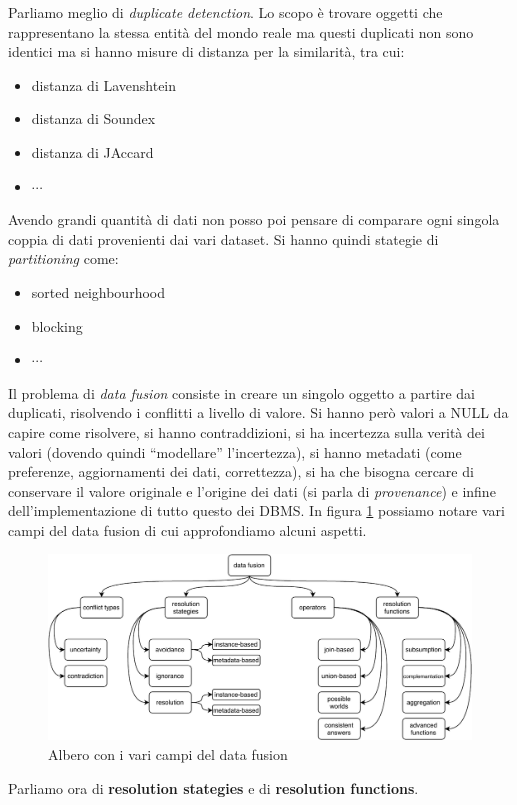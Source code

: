\documentclass[a4paper,12pt, oneside]{book}
\begin{document}
Parliamo meglio di \textit{duplicate detenction}. Lo scopo è trovare oggetti che
rappresentano la stessa entità del mondo reale ma questi duplicati non sono
identici ma si hanno misure di distanza per la similarità, tra cui:
\begin{itemize}
  \item distanza di Lavenshtein
  \item distanza di Soundex
  \item distanza di JAccard
  \item $\cdots$
\end{itemize}
Avendo grandi quantità di dati non posso poi pensare di comparare ogni singola
coppia di dati provenienti dai vari dataset. Si hanno quindi stategie di
\textit{partitioning} come:
\begin{itemize}
  \item sorted neighbourhood
  \item blocking
  \item $\cdots$
\end{itemize}
Il problema di \textit{data fusion} consiste in creare un singolo oggetto a
partire dai duplicati, risolvendo i conflitti a livello di valore. Si hanno però
valori a NULL da capire come risolvere, si hanno contraddizioni, si ha
incertezza sulla verità dei valori (dovendo quindi ``modellare'' l'incertezza),
si hanno metadati (come preferenze, aggiornamenti dei dati, correttezza), si ha
che bisogna cercare di conservare il valore originale e l'origine dei dati (si
parla di \textit{provenance}) e infine dell'implementazione di tutto questo dei
DBMS. In figura \ref{fig:df} possiamo notare vari campi del data fusion di cui
approfondiamo alcuni aspetti.
\begin{figure}
  \centering
  \includegraphics[width=\textwidth]{img/df.pdf}
  \caption{Albero con i vari campi del data fusion}
  \label{fig:df}
\end{figure}
Parliamo ora di \textbf{resolution stategies} e di \textbf{resolution
  functions}.\\
\end{document}
